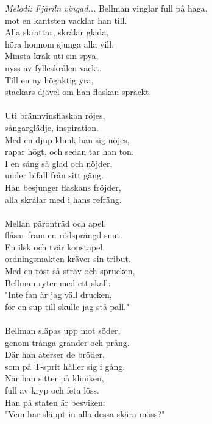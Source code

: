 {\footnotesize\textit{Melodi: Fjäriln vingad...}}
\vspace{10pt}
Bellman vinglar full på haga,\\
mot en kantsten vacklar han till.\\
Alla skrattar, skrålar glada,\\
höra honnom sjunga alla vill.\\
Minsta kräk uti sin spya,\\
nyss av fylleskrålen väckt.\\
Till en ny högaktig yra,\\
stackars djävel om han flaskan spräckt.\\
\\
Uti brännvinsflaskan röjes,\\
sångarglädje, inspiration.\\
Med en djup klunk han sig nöjes,\\
rapar högt, och sedan tar han ton.\\
I en sång så glad och nöjder,\\
under bifall från sitt gäng.\\
Han besjunger flaskans fröjder,\\
alla skrålar med i hans refräng.\\
\\
Mellan päronträd och apel,\\
flåsar fram en rödsprängd snut.\\
En ilsk och tvär konstapel,\\
ordningsmakten kräver sin tribut.\\
Med en röst så sträv och sprucken,\\
Bellman ryter med ett skall:\\
"Inte fan är jag väll drucken,\\
för en sup till skulle jag stå pall."\\
\\
Bellman släpas upp mot söder,\\
genom trånga gränder och prång.\\
Där han återser de bröder,\\
som på T-sprit håller sig i gång.\\
När han sitter på kliniken,\\
full av kryp och feta löss.\\
Han på staten är besviken:\\
"Vem har släppt in alla dessa skära möss?"
